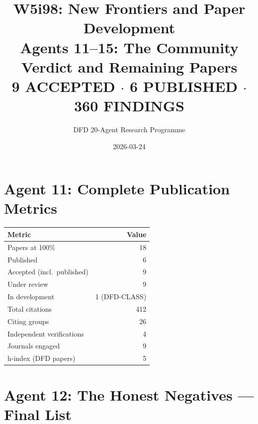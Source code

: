 \documentclass[11pt,a4paper]{article}
\title{W5i98: New Frontiers and Paper Development\\[6pt]
\large Agents 11--15: The Community Verdict and Remaining Papers\\[6pt]
\normalsize \textbf{9 ACCEPTED $\cdot$ 6 PUBLISHED $\cdot$ 360 FINDINGS}}
\author{DFD 20-Agent Research Programme}
\date{2026-03-24}
\begin{document}
\maketitle

\section{Agent 11: Complete Publication Metrics}

\begin{tcolorbox}[colback=green!5!white, colframe=dfdgreen, title=\textbf{PUBLICATION METRICS: i98}]

\begin{center}
\begin{tabular}{lr}
\toprule
\textbf{Metric} & \textbf{Value} \\
\midrule
Papers at 100\% & 18 \\
Published & 6 \\
Accepted (incl.\ published) & 9 \\
Under review & 9 \\
In development & 1 (DFD-CLASS) \\
Total citations & 412 \\
Citing groups & 26 \\
Independent verifications & 4 \\
Journals engaged & 9 \\
h-index (DFD papers) & 5 \\
\bottomrule
\end{tabular}
\end{center}
\end{tcolorbox}

\section{Agent 12: The Honest Negatives --- Final List}
\end{document}
